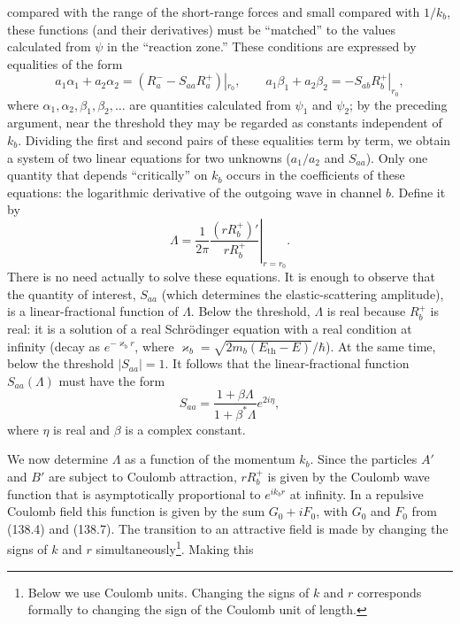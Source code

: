 compared with the range of the short-range forces and small compared with $1/k_b$, these functions (and their derivatives) must be ``matched'' to the values calculated from $\psi$ in the ``reaction zone.'' These conditions are expressed by equalities of the form
\[
 a_1\alpha_1+a_2\alpha_2=(R_a^--S_{aa}R_a^+)|_{r_0},\qquad
 a_1\beta_1+a_2\beta_2=-S_{ab}R_b^+|_{r_0},
\]
where $\alpha_1,\alpha_2,\beta_1,\beta_2,\ldots$ are quantities calculated from $\psi_1$ and $\psi_2$; by the preceding argument, near the threshold they may be regarded as constants independent of $k_b$. Dividing the first and second pairs of these equalities term by term, we obtain a system of two linear equations for two unknowns ($a_1/a_2$ and $S_{aa}$). Only one quantity that depends ``critically'' on $k_b$ occurs in the coefficients of these equations: the logarithmic derivative of the outgoing wave in channel $b$. Define it by
\[
 \Lambda=\left.\frac1{2\pi}\frac{(rR_b^+)'}{rR_b^+}\right|_{r=r_0}.
\]
There is no need actually to solve these equations. It is enough to observe that the quantity of interest, $S_{aa}$ (which determines the elastic-scattering amplitude), is a linear-fractional function of $\Lambda$. Below the threshold, $\Lambda$ is real because $R_b^+$ is real: it is a solution of a real Schrödinger equation with a real condition at infinity (decay as $e^{-\varkappa_b r}$, where $\varkappa_b=\sqrt{2m_b(E_{\mathrm{th}}-E)}/\hbar$). At the same time, below the threshold $|S_{aa}|=1$. It follows that the linear-fractional function $S_{aa}(\Lambda)$ must have the form
\begin{equation}
 S_{aa}=\frac{1+\beta\Lambda}{1+\beta^*\Lambda}e^{2i\eta},
 \tag{147.12}
\end{equation}
where $\eta$ is real and $\beta$ is a complex constant.

We now determine $\Lambda$ as a function of the momentum $k_b$. Since the particles $A'$ and $B'$ are subject to Coulomb attraction, $rR_b^+$ is given by the Coulomb wave function that is asymptotically proportional to $e^{ik_br}$ at infinity. In a repulsive Coulomb field this function is given by the sum $G_0+iF_0$, with $G_0$ and $F_0$ from (138.4) and (138.7). The transition to an attractive field is made by changing the signs of $k$ and $r$ simultaneously\footnote{Below we use Coulomb units. Changing the signs of $k$ and $r$ corresponds formally to changing the sign of the Coulomb unit of length.}. Making this


